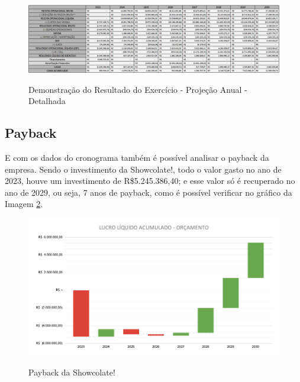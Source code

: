 \documentclass[
	12pt,				%
	openright,			%
	oneside,			%
	a4paper,			%
	english,			%
	french,				%
	spanish,			%
	brazil				%
	]{abntex2}
\begin{document}
\begin{landscape}

\begin{figure}[]
\begin{center}
\caption{Demonstração do Resultado do Exercício - Projeção Anual - Detalhada}
\includegraphics[scale=0.55]{a9.jpeg} 
\label{cro}
\end{center}
\end{figure}

\end{landscape}

\subsection{Payback}

E com os dados do cronograma também é possível analisar o payback da empresa. Sendo o investimento da Showcolate!, todo o valor gasto no ano de 2023, houve um investimento de R\$5.245.386,40; e esse valor só é recuperado no ano de 2029, ou seja, 7 anos de payback, como é possível verificar no gráfico da Imagem \ref{pay}.

\begin{figure}[H]
\begin{center}
\caption{Payback da Showcolate!}
\includegraphics[scale=0.28]{a12.png} 
\label{pay}
\end{center}
\end{figure}
\end{document}
